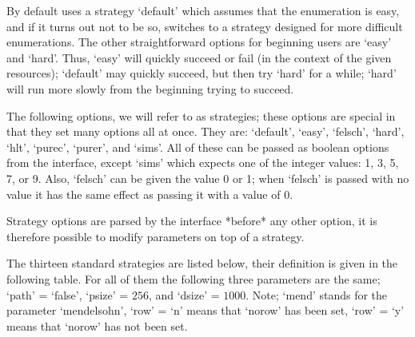     By default  {\ACE} uses  a strategy `default'  which assumes  that the
    enumeration is easy, and if it turns out not to be so, {\ACE} switches
    to  a strategy designed  for more  difficult enumerations.   The other
    straightforward  options for  beginning users  are `easy'  and `hard'.
    Thus, `easy' will quickly succeed or fail (in the context of the given
    resources); `default' may  quickly succeed, but then try  `hard' for a
    while;  `hard' will  run  more  slowly from  the  beginning trying  to
    succeed.

    The following options, we will refer to as strategies; these options
    are special in that they set many options all at once. They are:
    `default',  `easy',   `felsch', `hard', `hlt', `purec', `purer', and
    `sims'. All of these can be passed as boolean options from the {\ACE}
    interface, except `sims' which expects one of the integer values: 1,
    3, 5, 7, or 9. Also, `felsch' can be given the value 0 or 1; when
    `felsch' is passed with no value it has the same effect as passing it
    with a value of 0.

    Strategy  options  are parsed  by  the  interface  *before* any  other
    option,  it is therefore  possible to  modify parameters  on top  of a
    strategy.

    The thirteen standard strategies are listed below, their definition is
    given  in the following  table. For  all of  them the  following three
    parameters  are the  same;  `path'  = `false',  `psize'  = $256$,  and
    `dsize' = $1000$. Note;  `mend' stands for the parameter `mendelsohn',
    `row' =  `n' means that `norow' has  been set, `row' =  `y' means that
    `norow' has not been set.

